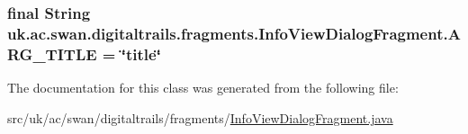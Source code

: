 \hypertarget{classuk_1_1ac_1_1swan_1_1digitaltrails_1_1fragments_1_1_info_view_dialog_fragment_abc5f258510b73a9b73edf43223860fd7}{
\subsubsection[{A\+R\+G\+\_\+\+T\+I\+T\+L\+E}]{\setlength{\rightskip}{0pt plus 5cm}final String uk.\+ac.\+swan.\+digitaltrails.\+fragments.\+Info\+View\+Dialog\+Fragment.\+A\+R\+G\+\_\+\+T\+I\+T\+L\+E = \char`\"{}title\char`\"{}\hspace{0.3cm}{\ttfamily [static]}}}\label{classuk_1_1ac_1_1swan_1_1digitaltrails_1_1fragments_1_1_info_view_dialog_fragment_abc5f258510b73a9b73edf43223860fd7}


The documentation for this class was generated from the following file\+:\begin{DoxyCompactItemize}
\item 
src/uk/ac/swan/digitaltrails/fragments/\hyperlink{_info_view_dialog_fragment_8java}{Info\+View\+Dialog\+Fragment.\+java}\end{DoxyCompactItemize}
